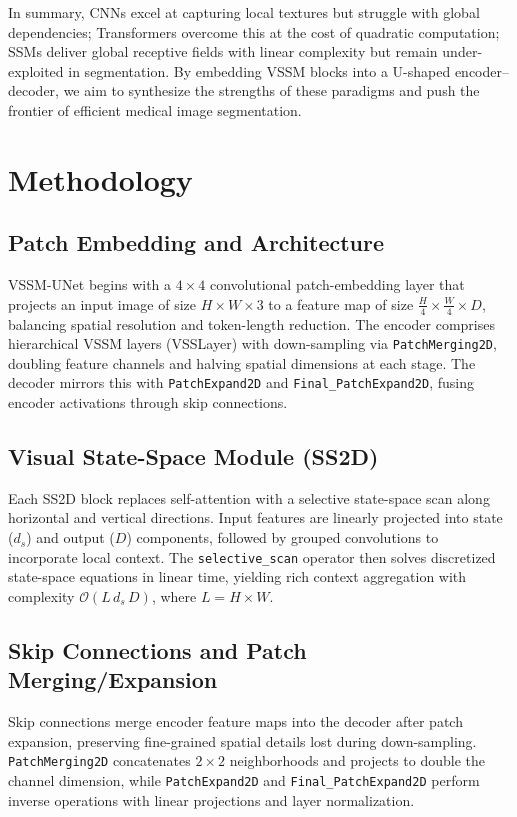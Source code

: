 \documentclass[conference]{IEEEtran}
\begin{document}
\smallskip
In summary, CNNs excel at capturing local textures but struggle with global dependencies; Transformers overcome this at the cost of quadratic computation; SSMs deliver global receptive fields with linear complexity but remain under-exploited in segmentation.  By embedding VSSM blocks into a U-shaped encoder–decoder, we aim to synthesize the strengths of these paradigms and push the frontier of efficient medical image segmentation.

\section{Methodology}
\subsection{Patch Embedding and Architecture}
VSSM-UNet begins with a \(4\times4\) convolutional patch-embedding layer that projects an input image of size \(H\times W \times3\) to a feature map of size \(\tfrac{H}{4}\times\tfrac{W}{4}\times D\), balancing spatial resolution and token-length reduction.  The encoder comprises hierarchical VSSM layers (VSSLayer) with down-sampling via \texttt{PatchMerging2D}, doubling feature channels and halving spatial dimensions at each stage.  The decoder mirrors this with \texttt{PatchExpand2D} and \texttt{Final\_PatchExpand2D}, fusing encoder activations through skip connections.

\subsection{Visual State-Space Module (SS2D)}
Each SS2D block replaces self-attention with a selective state-space scan along horizontal and vertical directions.  Input features are linearly projected into state (\(d_{s}\)) and output (\(D\)) components, followed by grouped convolutions to incorporate local context.  The \texttt{selective\_scan} operator then solves discretized state-space equations in linear time, yielding rich context aggregation with complexity \(\mathcal{O}(L\, d_{s}\, D)\), where \(L=H\times W\).

\subsection{Skip Connections and Patch Merging/Expansion}
Skip connections merge encoder feature maps into the decoder after patch expansion, preserving fine-grained spatial details lost during down-sampling.  \texttt{PatchMerging2D} concatenates \(2\times2\) neighborhoods and projects to double the channel dimension, while \texttt{PatchExpand2D} and \texttt{Final\_PatchExpand2D} perform inverse operations with linear projections and layer normalization.
\end{document}
